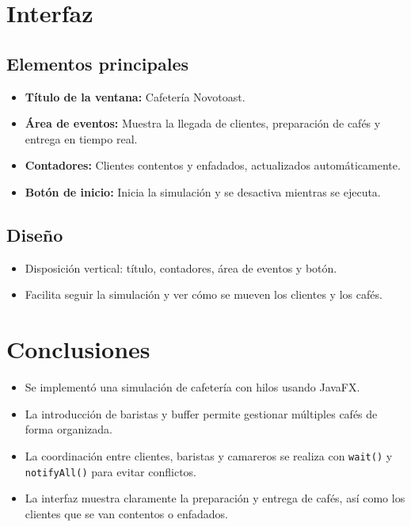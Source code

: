 \documentclass[12pt,a4paper]{article}
\begin{document}
\section{Interfaz}

\subsection*{Elementos principales}

\begin{itemize}
    \item \textbf{Título de la ventana:} Cafetería Novotoast.
    \item \textbf{Área de eventos:} Muestra la llegada de clientes, preparación de cafés y entrega en tiempo real.
    \item \textbf{Contadores:} Clientes contentos y enfadados, actualizados automáticamente.
    \item \textbf{Botón de inicio:} Inicia la simulación y se desactiva mientras se ejecuta.
\end{itemize}

\subsection*{Diseño}

\begin{itemize}
    \item Disposición vertical: título, contadores, área de eventos y botón.
    \item Facilita seguir la simulación y ver cómo se mueven los clientes y los cafés.
\end{itemize}


\section{Conclusiones}

\begin{itemize}
    \item Se implementó una simulación de cafetería con hilos usando JavaFX.
    \item La introducción de baristas y buffer permite gestionar múltiples cafés de forma organizada.
    \item La coordinación entre clientes, baristas y camareros se realiza con \texttt{wait()} y \texttt{notifyAll()} para evitar conflictos.
    \item La interfaz muestra claramente la preparación y entrega de cafés, así como los clientes que se van contentos o enfadados.
\end{itemize}
\end{document}
